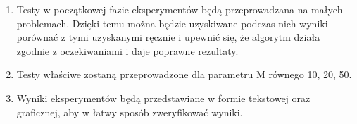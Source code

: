 \documentclass[a4paper]{article}
\begin{document}
\begin{enumerate}
\item Testy w początkowej fazie eksperymentów będą przeprowadzana na małych problemach. Dzięki temu można będzie uzyskiwane podczas nich wyniki porównać z tymi uzyskanymi ręcznie i upewnić się, że algorytm działa zgodnie z oczekiwaniami i daje poprawne rezultaty.
\item Testy właściwe zostaną przeprowadzone dla parametru M równego 10, 20, 50.
\item Wyniki eksperymentów będą przedstawiane w formie tekstowej oraz graficznej, aby w łatwy sposób zweryfikować wyniki.
\end{enumerate}
\end{document}
